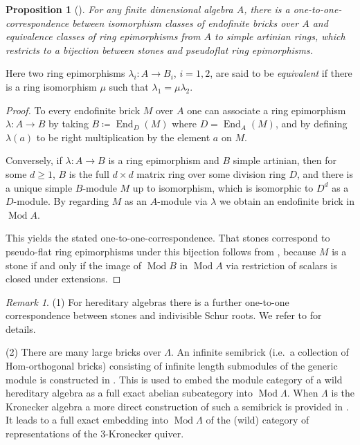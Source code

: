 \documentclass[a4paper]{amsart}
\theoremstyle{plain}
\newtheorem{prop}[thm]{Proposition}
\theoremstyle{definition}
\theoremstyle{remark}
\newtheorem{rem}[thm]{Remark}
\numberwithin{equation}{section}
\newcommand{\End}{\operatorname{End}}
\newcommand{\Mod}{\operatorname{Mod}}
\def\La{\Lambda}
\begin{document}
\begin{prop}[\cite{R4}]
  For any finite dimensional algebra $A$, there is a
  one-to-one-correspondence between isomorphism classes of endofinite
  bricks over $A$ and equivalence classes of ring epimorphisms from
  $A$ to simple artinian rings, which restricts to a bijection between
  stones and pseudoflat ring epimorphisms.
\end{prop}
Here two ring epimorphisms $\lambda_i\colon A\to B_i$, $i=1,2$, are
said to be \emph{equivalent} if there is a ring isomorphism $\mu$ such
that $\lambda_1=\mu\lambda_2$.
\begin{proof}
  To every endofinite brick $M$ over $A$ one can associate a ring
  epimorphism $\lambda\colon A\to B$  by
  taking $B\coloneqq\End_D(M)$ where $D=\End_A(M)$, and by defining
  $\lambda(a)$ to be right multiplication by the element $a$ on
  $M$.

  Conversely, if $\lambda\colon A\to B$ is a ring epimorphism and $B$
  simple artinian, then for some $d\ge 1$, $B$ is the full $d\times d$ matrix ring over
  some division ring $D$, and there
  is a unique simple $B$-module $M$ up to isomorphism, which is
  isomorphic to $D^d$ as a $D$-module. By regarding $M$ as an
  $A$-module via $\lambda$ we obtain an endofinite brick in $\Mod{A}$.

  This yields the stated one-to-one-correspondence.  That stones
  correspond to pseudo-flat ring epimorphisms under this bijection
  follows from \cite[Theorem 4.8]{Scho}, because $M$ is a stone if and
  only if the image of $\Mod B$ in $\Mod A$ via restriction of
  scalars is closed under extensions.
\end{proof}

\begin{rem}
  (1) For hereditary algebras there is a further
  one-to-one correspondence between stones and indivisible Schur
  roots. We refer to \cite[3.3]{CB2} for details.

  (2) There are many large bricks over $\La$. An infinite semibrick
  (i.e.~a collection of Hom-orthogonal bricks) consisting of infinite
  length submodules of the generic module is constructed in
  \cite[6.9]{Ri1979}. This is used to embed the module category of a
  wild hereditary algebra as a full exact abelian subcategory into
  $\Mod\La$. When $\La$ is the Kronecker algebra a more direct
  construction of such a semibrick is provided in \cite{tamewild}.  It
  leads to a full exact embedding into $\Mod\La$ of the (wild)
  category of representations of the $3$-Kronecker quiver.
\end{rem}
\end{document}
